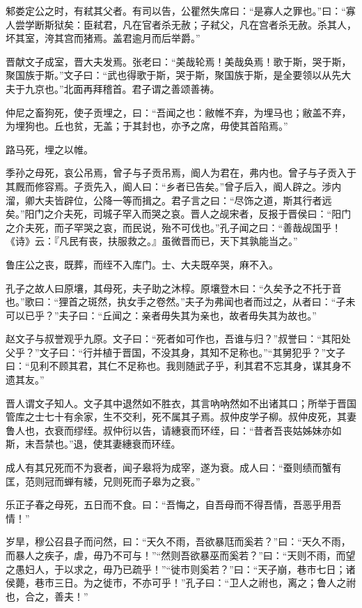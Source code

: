 \documentclass[]{article}
\begin{document}
邾娄定公之时，有弒其父者。有司以告，公瞿然失席曰：``是寡人之罪也。''曰：``寡人尝学断斯狱矣：臣弒君，凡在官者杀无赦；子弒父，凡在宫者杀无赦。杀其人，坏其室，洿其宫而猪焉。盖君逾月而后举爵。''

晋献文子成室，晋大夫发焉。张老曰：``美哉轮焉！美哉奂焉！歌于斯，哭于斯，聚国族于斯。''文子曰：``武也得歌于斯，哭于斯，聚国族于斯，是全要领以从先大夫于九京也。''北面再拜稽首。君子谓之善颂善祷。

仲尼之畜狗死，使子贡埋之，曰：``吾闻之也：敝帷不弃，为埋马也；敝盖不弃，为埋狗也。丘也贫，无盖；于其封也，亦予之席，毋使其首陷焉。''

路马死，埋之以帷。

季孙之母死，哀公吊焉，曾子与子贡吊焉，阍人为君在，弗内也。曾子与子贡入于其厩而修容焉。子贡先入，阍人曰：``乡者已告矣。''曾子后入，阍人辟之。涉内溜，卿大夫皆辟位，公降一等而揖之。君子言之曰：``尽饰之道，斯其行者远矣。''阳门之介夫死，司城子罕入而哭之哀。晋人之觇宋者，反报于晋侯曰：``阳门之介夫死，而子罕哭之哀，而民说，殆不可伐也。''孔子闻之曰：``善哉觇国乎！《诗》云：『凡民有丧，扶服救之。』虽微晋而已，天下其孰能当之。''

鲁庄公之丧，既葬，而绖不入库门。士、大夫既卒哭，麻不入。

孔子之故人曰原壤，其母死，夫子助之沐椁。原壤登木曰：``久矣予之不托于音也。''歌曰：``狸首之斑然，执女手之卷然。''夫子为弗闻也者而过之，从者曰：``子未可以已乎？''夫子曰：``丘闻之：亲者毋失其为亲也，故者毋失其为故也。''

赵文子与叔誉观乎九原。文子曰：``死者如可作也，吾谁与归？''叔誉曰：``其阳处父乎？''文子曰：``行并植于晋国，不没其身，其知不足称也。''``其舅犯乎？''文子曰：``见利不顾其君，其仁不足称也。我则随武子乎，利其君不忘其身，谋其身不遗其友。''

晋人谓文子知人。文子其中退然如不胜衣，其言吶吶然如不出诸其口；所举于晋国管库之士七十有余家，生不交利，死不属其子焉。叔仲皮学子柳。叔仲皮死，其妻鲁人也，衣衰而缪绖。叔仲衍以告，请繐衰而环绖，曰：``昔者吾丧姑姊妹亦如斯，末吾禁也。''退，使其妻繐衰而环绖。

成人有其兄死而不为衰者，闻子皋将为成宰，遂为衰。成人曰：``蚕则绩而蟹有匡，范则冠而蝉有緌，兄则死而子皋为之衰。''

乐正子春之母死，五日而不食。曰：``吾悔之，自吾母而不得吾情，吾恶乎用吾情！''

岁旱，穆公召县子而问然，曰：``天久不雨，吾欲暴尫而奚若？''曰：``天久不雨，而暴人之疾子，虐，毋乃不可与！''``然则吾欲暴巫而奚若？''曰：``天则不雨，而望之愚妇人，于以求之，毋乃已疏乎！''``徙市则奚若？''曰：``天子崩，巷市七日；诸侯薨，巷市三日。为之徙市，不亦可乎！''孔子曰：``卫人之祔也，离之；鲁人之祔也，合之，善夫！''
\end{document}
